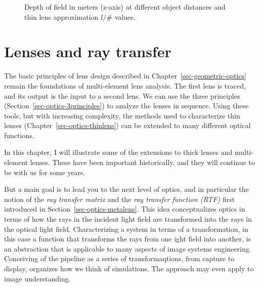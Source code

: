 \documentclass[
  letterpaper,
]{book}
\begin{document}
\begin{figure}


\caption{\label{fig-optics-dof}Depth of field in meters (z-axis) at
different object distances and thin lens approximation \(\mathrm{f}/\#\)
values.}

\end{figure}%

\chapter{Lenses and ray transfer}\label{sec-optics-morelenses}

The basic principles of lens design described in
Chapter~\ref{sec-geometric-optics} remain the foundations of
multi-element lens analysis. The first lens is traced, and its output is
the input to a second lens. We can use the three principles
(Section~\ref{sec-optics-3principles}) to analyze the lenses in
sequence. Using these tools, but with increasing complexity, the methods
used to characterize thin lenses (Chapter~\ref{sec-optics-thinlens}) can
be extended to many different optical functions.

In this chapter, I will illustrate some of the extensions to thick
lenses and multi-element lenses. These have been important historically,
and they will continue to be with us for some years.

But a main goal is to lead you to the next level of optics, and in
particular the notion of the \emph{ray transfer matrix} and the
\emph{ray transfer function (RTF)} first introduced in
Section~\ref{sec-optics-metalens}. This idea conceptualizes optics in
terms of how the rays in the incident light field are transformed into
the rays in the optical light field. Characterizing a system in terms of
a transformation, in this case a function that transforms the rays from
one ight field into another, is an abstraction that is applicable to
many aspects of image systems engineering. Conceiving of the pipeline as
a series of transformaqtions, from capture to display, organizes how we
think of simulations. The approach may even apply to image
understanding.
\end{document}
